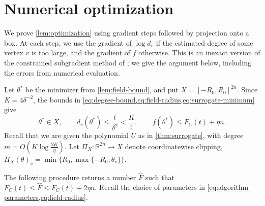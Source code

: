 \documentclass[11pt,reqno,letterpaper]{amsart}
\numberwithin{equation}{section}
\theoremstyle{definition}
\theoremstyle{remark}
\newcommand{\R}{\mathbb R}
\begin{document}




\appendix
\section{Numerical optimization}\label{app:numerical-minimization}



We prove \cref{lem:optimization} using gradient steps followed by
projection onto a box. At each step, we use the gradient of $\log d_v$ if the estimated
degree of some vertex $v$ is too large, and the gradient of $f$
otherwise.
This is an inexact version of the constrained subgradient method of
\cite[Sections~6--7]{BoydSubgradient}; we give the argument below,
including the errors from numerical evaluation.


Let $\theta^*$ be the minimizer from \cref{lem:field-bound}, and put
$X=[-R_0,R_0]^{2n}$. Since $K=4\delta^{-2}$, the bounds in
\cref{eq:degree-bound,eq:field-radius,eq:surrogate-minimum}  give
\[
 \theta^*\in X,\qquad
 d_v(\theta^*)\le\frac{t}{\delta^2}<\frac K4,
 \qquad
 f(\theta^*)\le F_C(t)+\eta n.
\]
Recall that we are given the polynomial $U$ as in \cref{thm:surrogate}, with degree  $m=O(K\log\frac{2K}{\eta})$. 
Let $\Pi_X:\R^{2n}\to X$ denote coordinatewise clipping,
$\Pi_X(\theta)_v=\min\{R_0,\max\{-R_0,\theta_v\}\}$.

The following procedure returns a number $\widehat F$ such that $F_C(t)\leq \widehat F\leq F_C(t)+2\eta n$. Recall the choice of parameters in \cref{eq:algorithm-parameters,eq:field-radius}.
\end{document}
